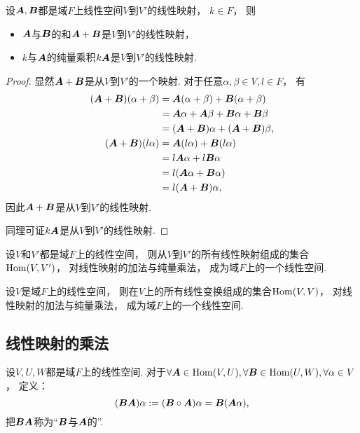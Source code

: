 \begin{proposition}
设\(\boldsymbol{A},\boldsymbol{B}\)都是域\(F\)上线性空间\(V\)到\(V'\)的线性映射，
\(k\in F\)，
则\begin{itemize}
	\item \(\boldsymbol{A}\)与\(\boldsymbol{B}\)的和\(\boldsymbol{A}+\boldsymbol{B}\)是\(V\)到\(V'\)的线性映射，
	\item \(k\)与\(\boldsymbol{A}\)的纯量乘积\(k\boldsymbol{A}\)是\(V\)到\(V'\)的线性映射.
\end{itemize}
\begin{proof}
显然\(\boldsymbol{A}+\boldsymbol{B}\)是从\(V\)到\(V'\)的一个映射.
对于任意\(\alpha,\beta \in V,
l \in F\)，
有\begin{align*}
	(\boldsymbol{A}+\boldsymbol{B})(\alpha+\beta)
	&= \boldsymbol{A}(\alpha+\beta) + \boldsymbol{B}(\alpha+\beta) \\
	&= \boldsymbol{A}\alpha + \boldsymbol{A}\beta + \boldsymbol{B}\alpha + \boldsymbol{B}\beta \\
	&= (\boldsymbol{A}+\boldsymbol{B})\alpha + (\boldsymbol{A}+\boldsymbol{B})\beta, \\
	(\boldsymbol{A}+\boldsymbol{B})(l\alpha)
	&= \boldsymbol{A}(l\alpha) + \boldsymbol{B}(l\alpha) \\
	&= l\boldsymbol{A}\alpha + l\boldsymbol{B}\alpha \\
	&= l(\boldsymbol{A}\alpha + \boldsymbol{B}\alpha) \\
	&= l(\boldsymbol{A}+\boldsymbol{B}) \alpha,
\end{align*}
因此\(\boldsymbol{A}+\boldsymbol{B}\)是从\(V\)到\(V'\)的线性映射.

同理可证\(k\boldsymbol{A}\)是从\(V\)到\(V'\)的线性映射.
\end{proof}
\end{proposition}

\begin{proposition}
设\(V\)和\(V'\)都是域\(F\)上的线性空间，
则从\(V\)到\(V'\)的所有线性映射组成的集合\(\operatorname{Hom}(V,V')\)，
对线性映射的加法与纯量乘法，
成为域\(F\)上的一个线性空间.
\end{proposition}
\begin{corollary}
设\(V\)是域\(F\)上的线性空间，
则在\(V\)上的所有线性变换组成的集合\(\operatorname{Hom}(V,V)\)，
对线性映射的加法与纯量乘法，
成为域\(F\)上的一个线性空间.
\end{corollary}

\subsection{线性映射的乘法}
\begin{definition}
设\(V,U,W\)都是域\(F\)上的线性空间.
对于\(\forall\boldsymbol{A}\in\operatorname{Hom}(V,U),
\forall\boldsymbol{B}\in\operatorname{Hom}(U,W),
\forall\alpha \in V\)，
定义：\begin{equation*}
	(\boldsymbol{B}\boldsymbol{A})\alpha
	:= (\boldsymbol{B} \circ \boldsymbol{A})\alpha
	= \boldsymbol{B}(\boldsymbol{A}\alpha),
\end{equation*}
把\(\boldsymbol{B}\boldsymbol{A}\)称为“\(\boldsymbol{B}\)与\(\boldsymbol{A}\)的”.
\end{definition}

